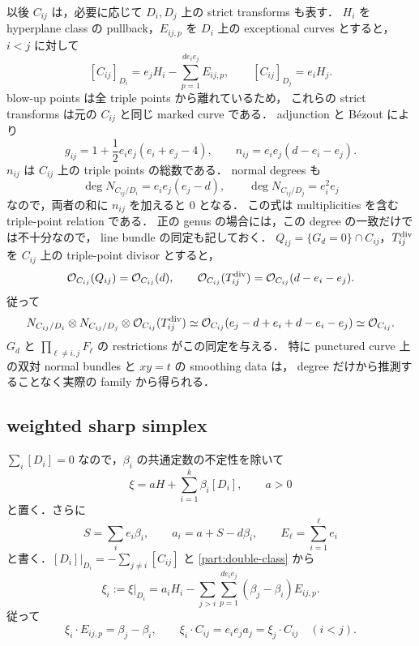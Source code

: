 以後 $C_{ij}$ は，必要に応じて $D_i,D_j$ 上の strict transforms も表す．
$H_i$ を hyperplane class の pullback，$E_{ij,p}$ を $D_i$ 上の exceptional curves とすると，
$i<j$ に対して
\begin{equation}\label{part:double-class}
 [C_{ij}]_{D_i}=e_jH_i-\sum_{p=1}^{d e_i e_j}E_{ij,p},
 \qquad [C_{ij}]_{D_j}=e_iH_j.
\end{equation}
blow-up points は全 triple points から離れているため，
これらの strict transforms は元の $C_{ij}$ と同じ marked curve である．
adjunction と Bézout により
\begin{equation}\label{part:curve-data}
 g_{ij}=1+\frac12e_i e_j(e_i+e_j-4),\qquad
 n_{ij}=e_i e_j(d-e_i-e_j).
\end{equation}
$n_{ij}$ は $C_{ij}$ 上の triple points の総数である．
normal degrees も
\[
 \deg N_{C_{ij}/D_i}=e_i e_j(e_j-d),\qquad
 \deg N_{C_{ij}/D_j}=e_i^2e_j
\]
なので，両者の和に $n_{ij}$ を加えると $0$ となる．
この式は multiplicities を含む triple-point relation である．
正の genus の場合には，この degree の一致だけでは不十分なので，
line bundle の同定も記しておく．
$Q_{ij}=\{G_d=0\}\cap C_{ij}$，$T_{ij}^{\rm div}$ を $C_{ij}$ 上の triple-point divisor とすると，
\[
 \mathcal O_{C_{ij}}(Q_{ij})=\mathcal O_{C_{ij}}(d),\qquad
 \mathcal O_{C_{ij}}(T_{ij}^{\rm div})
       =\mathcal O_{C_{ij}}(d-e_i-e_j).
\]
従って
\begin{equation}\label{part:normal-bundle}
 N_{C_{ij}/D_i}\otimes N_{C_{ij}/D_j}
       \otimes\mathcal O_{C_{ij}}(T_{ij}^{\rm div})
 \simeq
 \mathcal O_{C_{ij}}(e_j-d+e_i+d-e_i-e_j)
 \simeq\mathcal O_{C_{ij}}.
\end{equation}
$G_d$ と $\prod_{\ell\ne i,j}F_\ell$ の restrictions がこの同定を与える．
特に punctured curve 上の双対 normal bundles と $xy=t$ の smoothing data は，
degree だけから推測することなく実際の family から得られる．

\subsection{weighted sharp simplex}

$\sum_i[D_i]=0$ なので，$\beta_i$ の共通定数の不定性を除いて
\[
 \xi=aH+\sum_{i=1}^k\beta_i[D_i],\qquad a>0
\]
と置く．さらに
\[
 S=\sum_i e_i\beta_i,\qquad a_i=a+S-d\beta_i,\qquad
 E_\ell=\sum_{i=1}^{\ell}e_i
\]
と書く．$[D_i]|_{D_i}=-\sum_{j\ne i}[C_{ij}]$ と
\eqref{part:double-class} から
\begin{equation}\label{part:restriction}
 \xi_i:=\xi|_{D_i}
 =a_iH_i-\sum_{j>i}\sum_{p=1}^{d e_i e_j}
                (\beta_j-\beta_i)E_{ij,p}.
\end{equation}
従って
\begin{equation}\label{part:areas}
 \xi_i\cdot E_{ij,p}=\beta_j-\beta_i,\qquad
 \xi_i\cdot C_{ij}=e_i e_j a_j=\xi_j\cdot C_{ij}\quad(i<j).
\end{equation}

